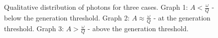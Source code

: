 \begin{figure}
\centering



\caption{Qualitative distribution of photons for three cases. 
  Graph 1: $A < \frac{\omega}{Q}$ - below the generation threshold.
  Graph 2: $A \approx \frac{\omega}{Q}$ - at the generation threshold.
  Graph 3: $A > \frac{\omega}{Q}$ - above the generation threshold.}
\label{figPart2Ch1_3}
\end{figure}
